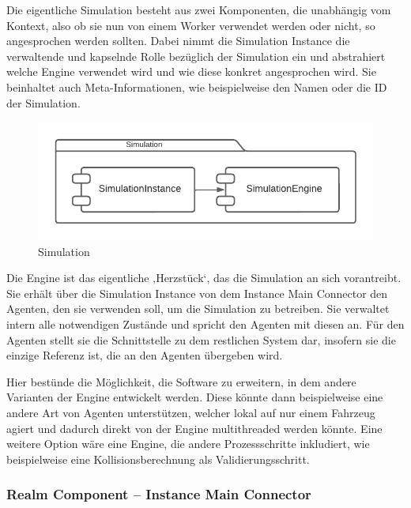 Die eigentliche Simulation besteht aus zwei Komponenten, die unabhängig vom Kontext, also ob sie nun von einem Worker verwendet werden oder nicht, so angesprochen werden sollten.
Dabei nimmt die Simulation Instance die verwaltende und kapselnde Rolle bezüglich der Simulation ein und abstrahiert welche Engine verwendet wird und wie diese konkret angesprochen wird.
Sie beinhaltet auch Meta-Informationen, wie beispielweise den Namen oder die ID der Simulation.

\begin{figure}[htb]
    \centering
    \includegraphics[scale=.65,center]{medien/simulation.pdf}
    \caption{Simulation}
    \ownsource
    \label{fig:simulation}
\end{figure}

\FloatBarrier

Die Engine ist das eigentliche ‚Herzstück‘, das die Simulation an sich vorantreibt.
Sie erhält über die Simulation Instance von dem Instance Main Connector den Agenten, den sie verwenden soll, um die Simulation zu betreiben.
Sie verwaltet intern alle notwendigen Zustände und spricht den Agenten mit diesen an.
Für den Agenten stellt sie die Schnittstelle zu dem restlichen System dar, insofern sie die einzige Referenz ist, die an den Agenten übergeben wird.

Hier bestünde die Möglichkeit, die Software zu erweitern, in dem andere Varianten der Engine entwickelt werden.
Diese könnte dann beispielweise eine andere Art von Agenten unterstützen, welcher lokal auf nur einem Fahrzeug agiert und dadurch direkt von der Engine multithreaded werden könnte.
Eine weitere Option wäre eine Engine, die andere Prozessschritte inkludiert, wie beispielweise eine Kollisionsberechnung als Validierungsschritt.

\subsubsection{Realm Component – Instance Main Connector}


